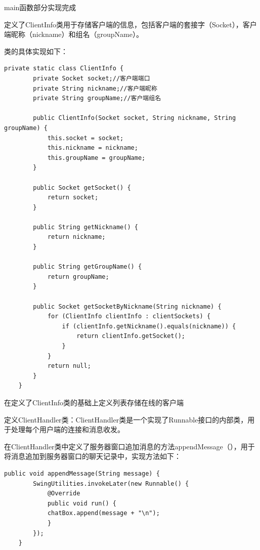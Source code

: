 \documentclass[UTF8,12pt]{article}
\begin{document}
main函数部分实现完成

定义了ClientInfo类用于存储客户端的信息，包括客户端的套接字（Socket），客户端昵称（nickname）和组名（groupName）。

类的具体实现如下：
\begin{lstlisting}[title=ClientInfo类的实现,frame=shadowbox]
    private static class ClientInfo {
        private Socket socket;//客户端端口
        private String nickname;//客户端昵称
        private String groupName;//客户端组名

        public ClientInfo(Socket socket, String nickname, String groupName) {
            this.socket = socket;
            this.nickname = nickname;
            this.groupName = groupName;
        }

        public Socket getSocket() {
            return socket;
        }

        public String getNickname() {
            return nickname;
        }

        public String getGroupName() {
            return groupName;
        }

        public Socket getSocketByNickname(String nickname) {
            for (ClientInfo clientInfo : clientSockets) {
                if (clientInfo.getNickname().equals(nickname)) {
                    return clientInfo.getSocket();
                }
            }
            return null;
        }
    }
\end{lstlisting}

在定义了ClientInfo类的基础上定义列表存储在线的客户端

定义ClientHandler类：ClientHandler类是一个实现了Runnable接口的内部类，用于处理每个用户端的连接和消息收发。

在ClientHandler类中定义了服务器窗口追加消息的方法appendMessage（），用于将消息追加到服务器窗口的聊天记录中，实现方法如下：
\begin{lstlisting}[title=appendMessage方法的实现,frame=shadowbox]
    public void appendMessage(String message) {
        SwingUtilities.invokeLater(new Runnable() {
            @Override
            public void run() {
            chatBox.append(message + "\n");
            }
        });
    }
\end{lstlisting}
\end{document}
